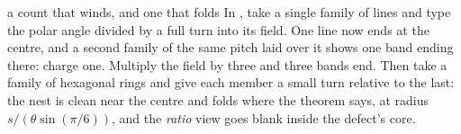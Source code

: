 \begin{tryit}{a count that winds, and one that folds}
In \Moire, take a single family of lines and type the polar angle divided
by a full turn into its field. One line now ends at the centre, and a
second family of the same pitch laid over it shows one band ending there:
charge one. Multiply the field by three and three bands end. Then take a
family of hexagonal rings and give each member a small turn relative to the
last: the nest is clean near the centre and folds where the theorem says,
at radius $s/(\theta\sin(\pi/6))$, and the \emph{ratio} view goes blank
inside the defect's core.
\end{tryit}
